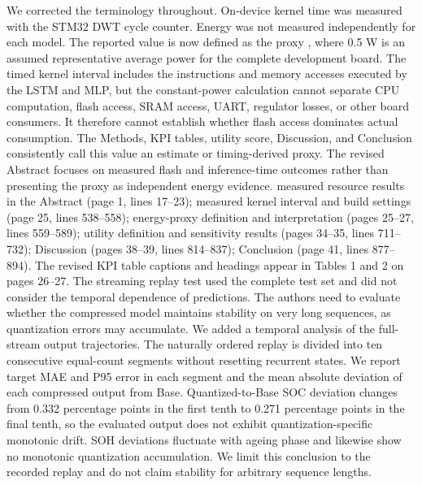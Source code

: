 {} We corrected the terminology throughout. On-device kernel time was measured with the STM32 DWT cycle counter. Energy was not measured independently for each model. The reported value is now defined as the proxy , where 0.5 W is an assumed representative average power for the complete development board. The timed kernel interval includes the instructions and memory accesses executed by the LSTM and MLP, but the constant-power calculation cannot separate CPU computation, flash access, SRAM access, UART, regulator losses, or other board consumers. It therefore cannot establish whether flash access dominates actual consumption. The Methods, KPI tables, utility score, Discussion, and Conclusion consistently call this value an estimate or timing-derived proxy. The revised Abstract focuses on measured flash and inference-time outcomes rather than presenting the proxy as independent energy evidence.\markdownRendererParagraphSeparator
{} measured resource results in the Abstract (page 1, lines 17--23); measured kernel interval and build settings (page 25, lines 538--558); energy-proxy definition and interpretation (pages 25--27, lines 559--589); utility definition and sensitivity results (pages 34--35, lines 711--732); Discussion (pages 38--39, lines 814--837); Conclusion (page 41, lines 877--894). The revised KPI table captions and headings appear in Tables 1 and 2 on pages 26--27.\markdownRendererInterblockSeparator
{}
\markdownRendererSectionEnd \markdownRendererSectionBegin
{}\markdownRendererInterblockSeparator
{}\markdownRendererBlockQuoteBegin
The streaming replay test used the complete test set and did not consider the temporal dependence of predictions. The authors need to evaluate whether the compressed model maintains stability on very long sequences, as quantization errors may accumulate.\markdownRendererBlockQuoteEnd \markdownRendererInterblockSeparator
{} We added a temporal analysis of the full-stream output trajectories. The naturally ordered replay is divided into ten consecutive equal-count segments without resetting recurrent states. We report target MAE and P95 error in each segment and the mean absolute deviation of each compressed output from Base. Quantized-to-Base SOC deviation changes from 0.332 percentage points in the first tenth to 0.271 percentage points in the final tenth, so the evaluated output does not exhibit quantization-specific monotonic drift. SOH deviations fluctuate with ageing phase and likewise show no monotonic quantization accumulation. We limit this conclusion to the recorded replay and do not claim stability for arbitrary sequence lengths.\markdownRendererParagraphSeparator
